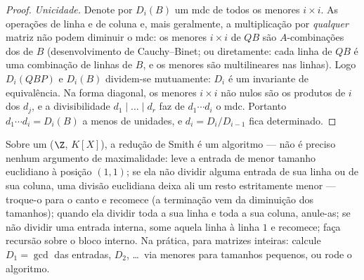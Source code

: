 \begin{proof}
\emph{Unicidade.} Denote por $D_i(B)$ um mdc de todos os menores
$i \times i$. As operações de linha e de coluna e, mais geralmente, a
multiplicação por \emph{qualquer} matriz não podem diminuir o mdc: os
menores $i \times i$ de $QB$ são $A$-combinações dos de $B$
(desenvolvimento de Cauchy--Binet; ou diretamente: cada linha de
$QB$ é uma combinação de linhas de $B$, e os menores são
multilineares nas linhas). Logo $D_i(QBP)$ e $D_i(B)$ dividem-se
mutuamente: $D_i$ é um invariante de equivalência. Na forma
diagonal, os menores $i
\times i$ não nulos são os produtos de $i$ dos
$d_j$, e a divisibilidade $d_1 \mid \dots \mid d_r$ faz de $d_1 \cdots d_i$ o mdc. Portanto $d_1 \cdots d_i = D_i(B)$
a menos de unidades, e $d_i =
D_i/D_{i-1}$ fica determinado.
\end{proof}

\begin{method}\label{met:b3:modules:smith}
Sobre um  ($\Z$, $K[X]$), a redução de Smith
é um algoritmo --- não é preciso nenhum argumento de maximalidade:
leve a entrada de menor tamanho euclidiano à posição $(1,1)$; se
ela não dividir alguma entrada de sua linha ou de sua coluna, uma
divisão euclidiana deixa ali um resto estritamente menor --- troque-o
para o canto e recomece (a terminação vem da diminuição dos tamanhos);
quando ela dividir toda a sua linha e toda a sua coluna, anule-as; se
não dividir uma entrada interna, some aquela linha à linha $1$ e
recomece; faça recursão sobre o bloco interno. Na prática, para
matrizes inteiras: calcule $D_1 = \gcd$ das entradas, $D_2$, \dots\ via
menores para tamanhos pequenos, ou rode o algoritmo.
\end{method}

